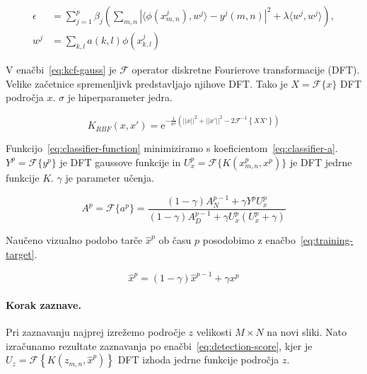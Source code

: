 \begin{equation}
\begin{aligned}
	\epsilon &= \sum_{j=1}^p \beta_j \left( 
	\sum_{m,n} \left| \langle \phi\left(x_{m,n}^j \right), w^j \rangle - y^j(m,n) \right|^2
    + \lambda \langle w^j, w^j \rangle
\right), \\
w^j &= \sum_{k,l} a(k,l) \phi\left(x_{k,l}^j  \right)
\end{aligned}
\label{eq:classifier-function}
\end{equation}

V enačbi~\eqref{eq:kcf-gauss} je $\mathcal{F}$ operator diskretne Fourierove transformacije (DFT). Velike začetnice spremenljivk predstavljajo njihove DFT. Tako je $X = \mathcal{F}\{ {x} \}$ DFT področja $x$. $\sigma$ je hiperparameter jedra.

\begin{equation}
K_{RBF}({x}, {x}') = \mathrm{e}^{-\frac{1}{\sigma^2}\left(
	||{x}||^2 + ||{x}'||^2 - 2 \mathcal{F}^{-1}\left\{ {X} {X}' \right\}
\right)}
\label{eq:kcf-gauss}
\end{equation}

Funkcijo~\eqref{eq:classifier-function} minimiziramo s koeficientom~\eqref{eq:classifier-a}.  $Y^p = \mathcal{F}\{y^p\}$ je DFT gaussove funkcije in $U_x^p = \mathcal{F}\{ K(x_{m,n}^p, x^p) \}$ je DFT jedrne funkcije $K$. $\gamma$ je parameter učenja.

\begin{equation}
A^p = \mathcal{F}\{a^p\} =  \frac{(1- \gamma) A_N^{p-1} + \gamma Y^p U_x^p}
{(1- \gamma)A_D^{p-1} + \gamma U_x^p\left( U_x^p + \gamma \right)}
\label{eq:classifier-a}
\end{equation}

Naučeno vizualno podobo tarče $\hat{x}^p$ ob času $p$ posodobimo z enačbo~\eqref{eq:training-target}.

\begin{equation}
\hat{x}^p = (1 - \gamma) \hat{x}^{p-1} + \gamma x^p
\label{eq:training-target}
\end{equation}


\paragraph{Korak zaznave.}
Pri zaznavanju najprej izrežemo področje $z$ velikosti $M \times N$ na novi sliki. Nato izračunamo rezultate zaznavanja po enačbi~\eqref{eq:detection-score}, kjer je $U_z = \mathcal{F}\left\{ K\left( z_{m,n}, \hat{x}^{p}  \right) \right\}$ DFT izhoda jedrne funkcije področja $z$.

